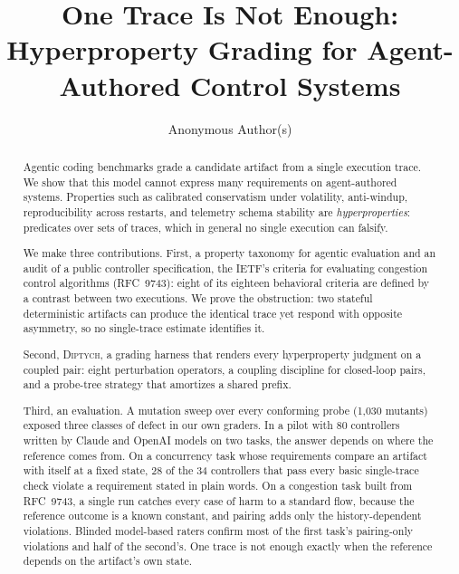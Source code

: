 \documentclass[sigconf,review,anonymous]{acmart}
\newcommand{\sys}{\textsc{Diptych}}
\begin{document}
\title{One Trace Is Not Enough: Hyperproperty Grading for Agent-Authored Control Systems}

\author{Anonymous Author(s)}

\begin{abstract}
Agentic coding benchmarks grade a candidate artifact from a single
execution trace. We show that this model cannot express many requirements
on agent-authored systems. Properties such as calibrated conservatism
under volatility, anti-windup, reproducibility across restarts, and
telemetry schema stability are \emph{hyperproperties}: predicates over
sets of traces, which in general no single execution can falsify.

We make three contributions. First, a property taxonomy for agentic
evaluation and an audit of a public controller specification, the
IETF's criteria for evaluating congestion control algorithms (RFC~9743):
eight of its eighteen behavioral criteria are defined by a contrast
between two executions. We prove the obstruction:
two stateful deterministic artifacts can produce the identical trace yet
respond with opposite asymmetry, so no single-trace estimate identifies it.

Second, \sys{}, a grading harness that renders every hyperproperty
judgment on a coupled pair: eight perturbation operators, a coupling
discipline for closed-loop pairs, and a probe-tree strategy that
amortizes a shared prefix.

Third, an evaluation. A mutation sweep over every conforming probe
(1{,}030 mutants) exposed three classes of defect in our own graders.
In a pilot with 80 controllers written by Claude and OpenAI models on
two tasks, the answer depends on where the reference comes from. On a
concurrency task whose requirements compare an artifact with itself at
a fixed state, 28 of the 34 controllers that pass every basic single-trace
check violate a requirement stated in plain words. On a congestion
task built from RFC~9743, a single run catches every case of harm to a
standard flow, because the reference outcome is a known constant, and
pairing adds only the history-dependent violations. Blinded
model-based raters confirm most of the first task's pairing-only
violations and half of the second's. One trace is not enough exactly
when the reference depends on the artifact's own state.
	\end{abstract}

\end{document}

